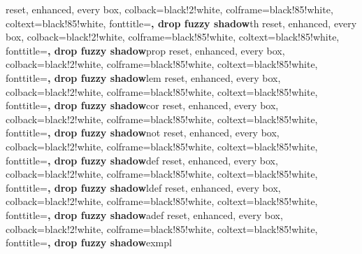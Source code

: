 %
{reset, enhanced, every box,
	colback=black!2!white, colframe=black!85!white, coltext=black!85!white,
	fonttitle=\small\bfseries, drop fuzzy shadow}{th}
%
{reset, enhanced, every box,
	colback=black!2!white, colframe=black!85!white, coltext=black!85!white,
	fonttitle=\small\bfseries, drop fuzzy shadow}{prop}
%
{reset, enhanced, every box,
	colback=black!2!white, colframe=black!85!white, coltext=black!85!white,
	fonttitle=\small\bfseries, drop fuzzy shadow}{lem}
%
{reset, enhanced, every box,
	colback=black!2!white, colframe=black!85!white, coltext=black!85!white,
	fonttitle=\small\bfseries, drop fuzzy shadow}{cor}
%
{reset, enhanced, every box,
	colback=black!2!white, colframe=black!85!white, coltext=black!85!white,
	fonttitle=\small\bfseries, drop fuzzy shadow}{not}
%
{reset, enhanced, every box,
	colback=black!2!white, colframe=black!85!white, coltext=black!85!white,
	fonttitle=\small\bfseries, drop fuzzy shadow}{def}
%
{reset, enhanced, every box,
	colback=black!2!white, colframe=black!85!white, coltext=black!85!white,
	fonttitle=\small\bfseries, drop fuzzy shadow}{ldef}
%
{reset, enhanced, every box,
	colback=black!2!white, colframe=black!85!white, coltext=black!85!white,
	fonttitle=\small\bfseries, drop fuzzy shadow}{adef}
%
{reset, enhanced, every box,
	colback=black!2!white, colframe=black!85!white, coltext=black!85!white,
	fonttitle=\small\bfseries, drop fuzzy shadow}{exmpl}
%
